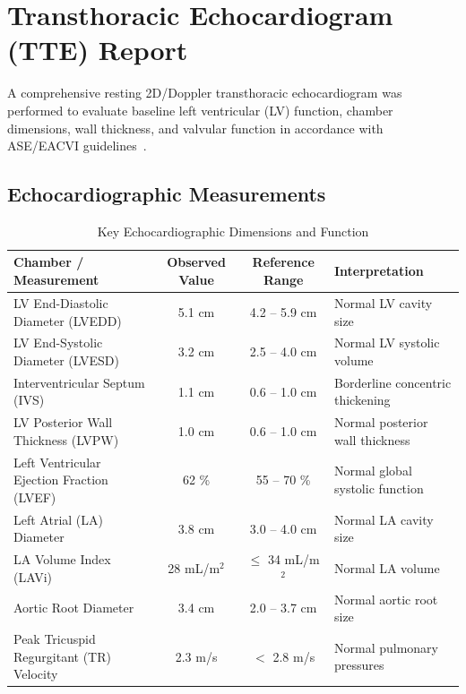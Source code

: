 \section{Transthoracic Echocardiogram (TTE) Report}

A comprehensive resting 2D/Doppler transthoracic echocardiogram was performed to evaluate baseline left ventricular (LV) function, chamber dimensions, wall thickness, and valvular function in accordance with ASE/EACVI guidelines~\cite{lang2015recommendations}.

\subsection{Echocardiographic Measurements}

\begin{table}[H]
\centering
\caption{Key Echocardiographic Dimensions and Function}
\label{tab:echo_measurements}
\begin{tabularx}{\textwidth}{l c c X}
\toprule
\textbf{Chamber / Measurement} & \textbf{Observed Value} & \textbf{Reference Range} & \textbf{Interpretation} \\
\midrule
LV End-Diastolic Diameter (LVEDD) & 5.1 cm & 4.2 -- 5.9 cm & Normal LV cavity size \\
LV End-Systolic Diameter (LVESD) & 3.2 cm & 2.5 -- 4.0 cm & Normal LV systolic volume \\
Interventricular Septum (IVS) & 1.1 cm & 0.6 -- 1.0 cm & Borderline concentric thickening \\
LV Posterior Wall Thickness (LVPW) & 1.0 cm & 0.6 -- 1.0 cm & Normal posterior wall thickness \\
Left Ventricular Ejection Fraction (LVEF) & 62 \% & 55 -- 70 \% & Normal global systolic function \\
Left Atrial (LA) Diameter & 3.8 cm & 3.0 -- 4.0 cm & Normal LA cavity size \\
LA Volume Index (LAVi) & 28 mL/m$^2$ & $\le$ 34 mL/m$^2$ & Normal LA volume \\
Aortic Root Diameter & 3.4 cm & 2.0 -- 3.7 cm & Normal aortic root size \\
Peak Tricuspid Regurgitant (TR) Velocity & 2.3 m/s & $<$ 2.8 m/s & Normal pulmonary pressures \\
\bottomrule
\end{tabularx}
\end{table}

